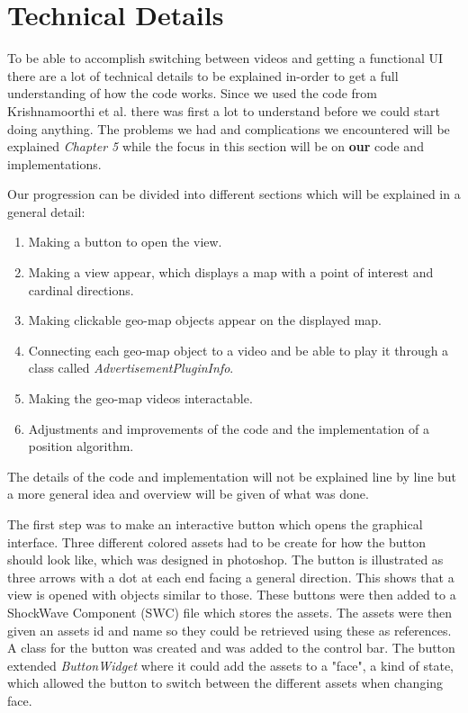 \section{Technical Details}
\label{sec:technicaldetails}

To be able to accomplish switching between videos and getting a functional UI there are a lot of technical details to be explained in-order to get a full understanding of how the code works. Since we used the code from Krishnamoorthi et al. \cite{qualbranch} there was first a lot to understand before we could start doing anything. The problems we had and complications we encountered will be explained \textit{Chapter 5} while the focus in this section will be on \textbf{our} code and implementations. 

Our progression can be divided into different sections which will be explained in a general detail:

\begin{enumerate}
\item Making a button to open the view.

\item Making a view appear, which displays a map with a point of interest and cardinal directions.

\item Making clickable geo-map objects appear on the displayed map.

\item Connecting each geo-map object to a video and be able to play it through a class called \textit{AdvertisementPluginInfo}.

\item Making the geo-map videos interactable.


\item Adjustments and improvements of the code and the implementation of a position algorithm. 
\end{enumerate}

The details of the code and implementation will not be explained line by line but a more general idea and overview will be given of what was done.

The first step was to make an interactive button which opens the graphical interface. Three different colored assets had to be create for how the button should look like, which was designed in photoshop. The button is illustrated as three arrows with a dot at each end facing a general direction. This shows that a view is opened with objects similar to those. These buttons were then added to a ShockWave Component (SWC) file which stores the assets. The assets were then given an assets id and name so they could be retrieved using these as references. A class for the button was created and was added to the control bar. The button extended \textit{ButtonWidget} where it could add the assets to a "face", a kind of state, which allowed the button to switch between the different assets when changing face. 


